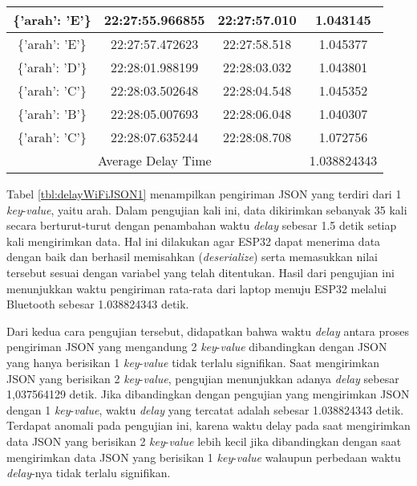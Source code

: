 \begin{longtable}{|ccc|c|}
    \multicolumn{1}{|c|}{\{'arah': 'E'\}} & \multicolumn{1}{c|}{22:27:55.966855} & 22:27:57.010       & 1.043145    \\ \hline
    \multicolumn{1}{|c|}{\{'arah': 'E'\}} & \multicolumn{1}{c|}{22:27:57.472623} & 22:27:58.518       & 1.045377    \\ \hline
    \multicolumn{1}{|c|}{\{'arah': 'D'\}} & \multicolumn{1}{c|}{22:28:01.988199} & 22:28:03.032       & 1.043801    \\ \hline
    \multicolumn{1}{|c|}{\{'arah': 'C'\}} & \multicolumn{1}{c|}{22:28:03.502648} & 22:28:04.548       & 1.045352    \\ \hline
    \multicolumn{1}{|c|}{\{'arah': 'B'\}} & \multicolumn{1}{c|}{22:28:05.007693} & 22:28:06.048       & 1.040307    \\ \hline
    \multicolumn{1}{|c|}{\{'arah': 'C'\}} & \multicolumn{1}{c|}{22:28:07.635244} & 22:28:08.708       & 1.072756    \\ \hline
    \multicolumn{3}{|c|}{Average Delay Time}                                                          & 1.038824343 \\ \hline
\end{longtable}

Tabel \ref{tbl:delayWiFiJSON1} menampilkan pengiriman JSON yang terdiri dari 1 \emph{key}-\emph{value}, yaitu arah. Dalam pengujian kali ini, data dikirimkan sebanyak 35 kali secara berturut-turut dengan penambahan waktu \emph{delay} sebesar 1.5 detik setiap kali mengirimkan data. Hal ini dilakukan agar ESP32 dapat menerima data dengan baik dan berhasil memisahkan (\emph{deserialize}) serta memasukkan nilai tersebut sesuai dengan variabel yang telah ditentukan. Hasil dari pengujian ini menunjukkan waktu pengiriman rata-rata dari laptop menuju ESP32 melalui Bluetooth sebesar 1.038824343 detik.

Dari kedua cara pengujian tersebut, didapatkan bahwa waktu \emph{delay} antara proses pengiriman JSON yang mengandung 2 \emph{key}-\emph{value} dibandingkan dengan JSON yang hanya berisikan 1 \emph{key}-\emph{value} tidak terlalu signifikan. Saat mengirimkan JSON yang berisikan 2 \emph{key}-\emph{value}, pengujian menunjukkan adanya \emph{delay} sebesar 1,037564129 detik. Jika dibandingkan dengan pengujian yang mengirimkan JSON dengan 1 \emph{key}-\emph{value}, waktu \emph{delay} yang tercatat adalah sebesar 1.038824343 detik. Terdapat anomali pada pengujian ini, karena waktu delay pada saat mengirimkan data JSON yang berisikan 2 \emph{key}-\emph{value} lebih kecil jika dibandingkan dengan saat mengirimkan data JSON yang berisikan 1 \emph{key}-\emph{value} walaupun perbedaan waktu \emph{delay}-nya tidak terlalu signifikan.

